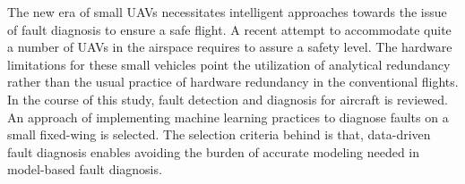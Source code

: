 % 
% 
%

The new era of small UAVs necessitates intelligent approaches towards 
the issue of fault diagnosis to ensure a safe flight. A recent attempt to 
accommodate quite a number of UAVs in the airspace requires to assure a safety level.
The hardware limitations for these small vehicles point the utilization of analytical 
redundancy rather than the usual practice of hardware redundancy in the conventional flights.
In the course of this study, fault detection and diagnosis for aircraft is reviewed. 
An approach of implementing machine learning practices to diagnose faults on a small 
fixed-wing is selected. The selection criteria behind is that, data-driven fault diagnosis 
enables avoiding the burden of accurate modeling needed in model-based fault diagnosis.